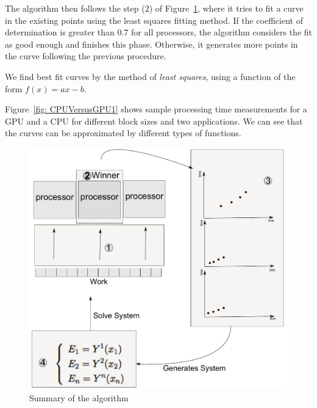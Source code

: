\documentclass[journal]{IEEEtran}
\begin{document}
The algorithm then follows the step (2) of Figure~\ref{fig: algoritmo}, where it
tries to fit a curve in the existing points using the least squares fitting
method. If the coefficient of determination is greater than 0.7 for all
processors, the algorithm considers the fit as good enough and finishes this
phase. Otherwise, it generates more points in the curve following the previous
procedure.
 

We find best fit curves by the method of \textit{least squares}, using a
function of the form $f(x) = a x - b$.

Figure~\ref{fig: CPUVersusGPU1} shows sample processing time measurements for a
GPU and a CPU for different block sizes and two applications. We can see that
the curves can be approximated by different types of functions. 

\begin{figure}[!t]
	\centering
	\includegraphics[scale=0.33]{diagramaAlgoritmo.pdf} 
	\caption{Summary of the algorithm}
	\label{fig: algoritmo}
\end{figure}

\end{document}
